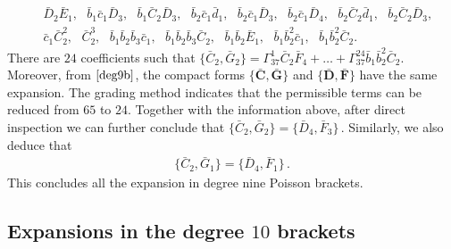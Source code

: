 \documentclass[10pt]{amsart}
\theoremstyle{definition}
\theoremstyle{corollary}
\theoremstyle{remark}
\theoremstyle{conclusion}
\begin{document}
\begin{align*}
    & \,  \bar{D}_2 \bar{E}_1, \text{ } \bar{b}_1 \bar{c}_1 \bar{D}_3, \text{ } \bar{b}_1 \bar{C}_2 \bar{D}_3, \text{ } \bar{b}_2 \bar{c}_1 \bar{d}_1, \text{ } \bar{b}_2 \bar{c}_1 \bar{D}_3, \text{ }\bar{b}_2 \bar{c}_1 \bar{D}_4,  \text{ } \bar{b}_2 \bar{C}_2 \bar{d}_1, \text{ } \bar{b}_2 \bar{C}_2 \bar{D}_3, \\
    & \, \bar{c}_1 \bar{C}_2^2,\text{ } \bar{C}_2^3, \text{ } \bar{b}_1 \bar{b}_2 \bar{b}_3 \bar{c}_1, \text{ } \bar{b}_1 \bar{b}_2 \bar{b}_3 \bar{C}_2, \text{ } \bar{b}_1 \bar{b}_2 \bar{E}_1, \text{ } \bar{b}_1 \bar{b}_2^2 \bar{c}_1, \text{ } \bar{b}_1 \bar{b}_2^2 \bar{C}_2.
\end{align*} There are $24$ coefficients such that $\{\bar{C}_2,\bar{G}_2\} = \Gamma_{37}^1 \bar{C}_2 \bar{F}_4 +\ldots + \Gamma_{37}^{24}\bar{b}_1 \bar{b}_2^2 \bar{C}_2.$ Moreover, from $\eqref{deg9b}$, the compact forms $\{\bar{\textbf{C}},\bar{\textbf{G}}\}$ and $\{\bar{\textbf{D}},\bar{\textbf{F}}\}$ have the same expansion. The grading method indicates that the permissible terms can be reduced from $65$ to $24.$ Together with the information above, after direct inspection we can further conclude that $\{\bar{C}_2, \bar{G}_2\} =\{\bar{D}_4, \bar{F}_3\} \, . $  Similarly, we also deduce that
\begin{align}
 \{\bar{C}_2, \bar{G}_1\} =\{\bar{D}_4, \bar{F}_1\} \, .
\end{align}  This concludes all the expansion in degree nine Poisson brackets.
\vskip 0.5cm


\subsection{Expansions in the degree $10$ brackets}
\end{document}
